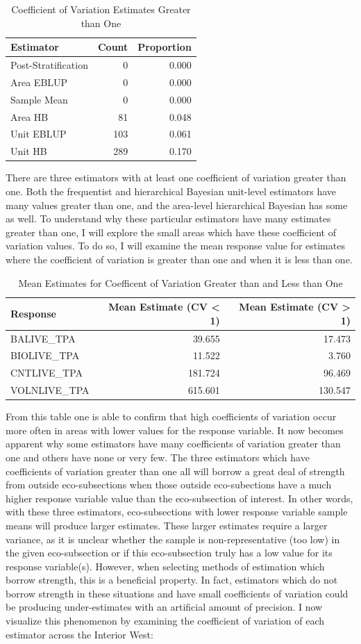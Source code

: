 \documentclass[12pt,twoside]{reedthesis}
\begin{document}
\begin{longtable}[t]{lrr}
\caption{\label{tab:over-one}Coefficient of Variation Estimates Greater than One}\\
\toprule
Estimator & Count & Proportion\\
\midrule
Post-Stratification & 0 & 0.000\\
Area EBLUP & 0 & 0.000\\
Sample Mean & 0 & 0.000\\
Area HB & 81 & 0.048\\
Unit EBLUP & 103 & 0.061\\
\addlinespace
Unit HB & 289 & 0.170\\
\bottomrule
\end{longtable}
There are three estimators with at least one coefficient of variation greater than one. Both the frequentist and hierarchical Bayesian unit-level estimators have many values greater than one, and the area-level hierarchical Bayesian has some as well. To understand why these particular estimators have many estimates greater than one, I will explore the small areas which have these coefficient of variation values. To do so, I will examine the mean response value for estimates where the coefficient of variation is greater than one and when it is less than one.
\clearpage
\begin{longtable}[t]{lrr}
\caption{\label{tab:covg1l1}Mean Estimates for Coefficent of Variation Greater than and Less than One}\\
\toprule
Response & Mean Estimate (CV < 1) & Mean Estimate (CV > 1)\\
\midrule
BALIVE\_TPA & 39.655 & 17.473\\
BIOLIVE\_TPA & 11.522 & 3.760\\
CNTLIVE\_TPA & 181.724 & 96.469\\
VOLNLIVE\_TPA & 615.601 & 130.547\\
\bottomrule
\end{longtable}
From this table one is able to confirm that high coefficients of variation occur more often in areas with lower values for the response variable. It now becomes apparent why some estimators have many coefficients of variation greater than one and others have none or very few. The three estimators which have coefficients of variation greater than one all will borrow a great deal of strength from outside eco-subsections when those outside eco-subections have a much higher response variable value than the eco-subsection of interest. In other words, with these three estimators, eco-subsections with lower response variable sample means will produce larger estimates. These larger estimates require a larger variance, as it is unclear whether the sample is non-representative (too low) in the given eco-subsection or if this eco-subsection truly has a low value for its response variable(s). However, when selecting methods of estimation which borrow strength, this is a beneficial property. In fact, estimators which do not borrow strength in these situations and have small coefficients of variation could be producing under-estimates with an artificial amount of precision. I now visualize this phenomenon by examining the coefficient of variation of each estimator across the Interior West:
\end{document}

